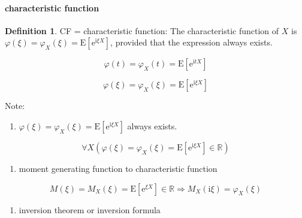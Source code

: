 \documentclass[
]{book}
\providecommand{\tightlist}{%
  \setlength{\itemsep}{0pt}\setlength{\parskip}{0pt}}
\theoremstyle{definition}
\newtheorem{definition}{Definition}[chapter]
\theoremstyle{definition}
\theoremstyle{definition}
\theoremstyle{definition}
\theoremstyle{remark}
\begin{document}
\paragraph{characteristic function}\label{characteristic-function}

\begin{definition}
\protect\hypertarget{def:unnamed-chunk-30}{}\label{def:unnamed-chunk-30}CF = characteristic function: The characteristic function of \(X\) is \(\varphi\left(\xi\right)=\varphi_{{\scriptscriptstyle X}}\left(\xi\right)=\mathrm{E}\left[\mathrm{e}^{\mathrm{i}\xi X}\right]\), provided that the expression always exists.
\end{definition}

\[
\varphi\left(t\right)=\varphi_{{\scriptscriptstyle X}}\left(t\right)=\mathrm{E}\left[\mathrm{e}^{\mathrm{i}tX}\right]
\]

\[
\varphi\left(\xi\right)=\varphi_{{\scriptscriptstyle X}}\left(\xi\right)=\mathrm{E}\left[\mathrm{e}^{\mathrm{i}\xi X}\right]
\]

Note:

\begin{enumerate}
\def\labelenumi{\arabic{enumi}.}
\tightlist
\item
  \(\varphi\left(\xi\right)=\varphi_{{\scriptscriptstyle X}}\left(\xi\right)=\mathrm{E}\left[\mathrm{e}^{\mathrm{i}\xi X}\right]\) always exists.
\end{enumerate}

\[
\forall X\left(\varphi\left(\xi\right)=\varphi_{{\scriptscriptstyle X}}\left(\xi\right)=\mathrm{E}\left[\mathrm{e}^{\mathrm{i}\xi X}\right]\in\mathbb{R}\right)
\]

\begin{enumerate}
\def\labelenumi{\arabic{enumi}.}
\setcounter{enumi}{1}
\tightlist
\item
  moment generating function to characteristic function
\end{enumerate}

\[
M\left(\xi\right)=M_{{\scriptscriptstyle X}}\left(\xi\right)=\mathrm{E}\left[\mathrm{e}^{\xi X}\right]\in\mathbb{R}\Rightarrow M_{{\scriptscriptstyle X}}\left(\mathrm{i}\xi\right)=\varphi_{{\scriptscriptstyle X}}\left(\xi\right)
\]

\begin{enumerate}
\def\labelenumi{\arabic{enumi}.}
\setcounter{enumi}{2}
\tightlist
\item
  inversion theorem or inversion formula
\end{enumerate}
\end{document}
